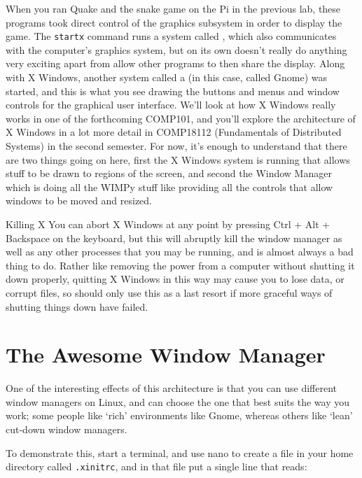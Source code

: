 When you ran Quake and the snake game on the Pi in the previous lab, these programs took direct control of the graphics subsystem in order to display the game. The \texttt{startx} command runs a system called , which also communicates with the computer's graphics system, but on its own doesn't really do anything very exciting apart from allow other programs to then share the display. Along with X Windows, another system called a  (in this case, called Gnome) was started, and this is what you see drawing the buttons and menus and window controls for the graphical user interface. We'll look at how X Windows really works in one of the forthcoming COMP101, and you'll explore the architecture of X Windows in a lot more detail in COMP18112 (Fundamentals of Distributed Systems) in the second semester. For now, it's enough to understand that there are two things going on here, first the X Windows system is running that allows stuff to be drawn to regions of the screen, and second the Window Manager which is doing all the WIMPy stuff like providing all the controls that allow windows to be moved and resized. 

\begin{danger}{Killing X}
You can abort X Windows at any point by pressing Ctrl + Alt + Backspace on the keyboard, but this will abruptly kill the window manager as well as any other processes that you may be running, and is almost always a bad thing to do. Rather like removing the power from a computer without shutting it down properly, quitting X Windows in this way may cause you to lose data, or corrupt files, so should only use this as a last resort if more graceful ways of shutting things down have failed.
\end{danger}


\section{The Awesome Window Manager}
One of the interesting effects of this architecture is that you can use different window managers on Linux, and can choose the one that best suits the way you work; some people like `rich' environments like Gnome, whereas others like `lean' cut-down window managers. 

To demonstrate this, start a terminal, and use nano to create a file in your home directory called \texttt{.xinitrc}, and in that file put a single line that reads:

